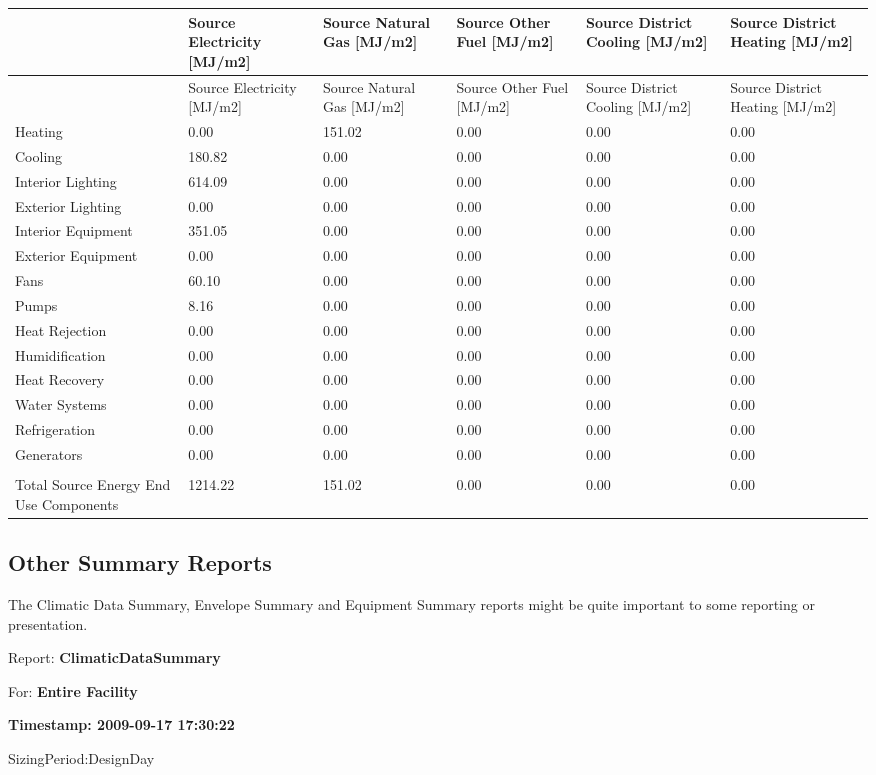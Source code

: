 {\scriptsize
\begin{longtable}[c]{>{\raggedright}p{1.0in}>{\raggedright}p{1.0in}>{\raggedright}p{1.0in}>{\raggedright}p{1.0in}>{\raggedright}p{1.0in}>{\raggedright}p{1.0in}}
\toprule 
 & Source Electricity [MJ/m2] & Source Natural Gas [MJ/m2] & Source Other Fuel [MJ/m2] & Source District Cooling [MJ/m2] & Source District Heating [MJ/m2] \tabularnewline
\midrule
\endfirsthead

\toprule 
 & Source Electricity [MJ/m2] & Source Natural Gas [MJ/m2] & Source Other Fuel [MJ/m2] & Source District Cooling [MJ/m2] & Source District Heating [MJ/m2] \tabularnewline
\midrule
\endhead

Heating & 0.00 & 151.02 & 0.00 & 0.00 & 0.00 \tabularnewline
Cooling & 180.82 & 0.00 & 0.00 & 0.00 & 0.00 \tabularnewline
Interior Lighting & 614.09 & 0.00 & 0.00 & 0.00 & 0.00 \tabularnewline
Exterior Lighting & 0.00 & 0.00 & 0.00 & 0.00 & 0.00 \tabularnewline
Interior Equipment & 351.05 & 0.00 & 0.00 & 0.00 & 0.00 \tabularnewline
Exterior Equipment & 0.00 & 0.00 & 0.00 & 0.00 & 0.00 \tabularnewline
Fans & 60.10 & 0.00 & 0.00 & 0.00 & 0.00 \tabularnewline
Pumps & 8.16 & 0.00 & 0.00 & 0.00 & 0.00 \tabularnewline
Heat Rejection & 0.00 & 0.00 & 0.00 & 0.00 & 0.00 \tabularnewline
Humidification & 0.00 & 0.00 & 0.00 & 0.00 & 0.00 \tabularnewline
Heat Recovery & 0.00 & 0.00 & 0.00 & 0.00 & 0.00 \tabularnewline
Water Systems & 0.00 & 0.00 & 0.00 & 0.00 & 0.00 \tabularnewline
Refrigeration & 0.00 & 0.00 & 0.00 & 0.00 & 0.00 \tabularnewline
Generators & 0.00 & 0.00 & 0.00 & 0.00 & 0.00 \tabularnewline
 &  &  &  &  &  \tabularnewline
Total Source Energy End Use Components & 1214.22 & 151.02 & 0.00 & 0.00 & 0.00 \tabularnewline
\bottomrule
\end{longtable}}

\subsection{Other Summary Reports}\label{other-summary-reports}

The Climatic Data Summary, Envelope Summary and Equipment Summary reports might be quite important to some reporting or presentation.

Report: \textbf{ClimaticDataSummary}

For: \textbf{Entire Facility}

\textbf{Timestamp: 2009-09-17 17:30:22}

SizingPeriod:DesignDay

